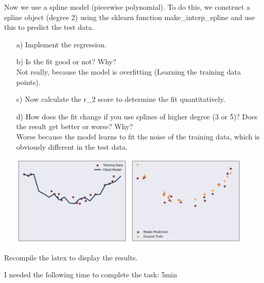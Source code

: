 Now we use a spline model (piecewise polynomial). To do this, we construct a spline object (degree 2) using the sklearn function make\_interp\_spline and use this to predict the test data.

\begin{enumerate}

\item[a)] Implement the regression.

\item[b)] Is the fit good or not? Why? \\
Not really, because the model is overfitting (Learning the training data points).

\item[c)] Now calculate the r\_2 score to determine the fit quantitatively.

\item[d)] How does the fit change if you use splines of higher degree (3 or 5)? Does the result get better or worse? Why?\\
Worse because the model learns to fit the noise of the training data, which is obviously different in the test data.

\includegraphics[width=0.45\textwidth]{source_code/overfit_spline_model.png}
\includegraphics[width=0.45\textwidth]{source_code/overfit_spline_testdata.png}

\end{enumerate}

Recompile the latex to display the results.

I needed the following time to complete the task: 5min

